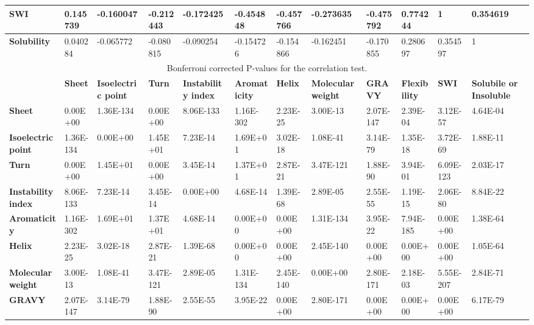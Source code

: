 \begin{table}[h]
{{\begin{tabular}{|l|l|l|l|l|l|l|l|l|l|l|l|}
\textbf{SWI}               & 0.145739  & -0.160047 & -0.212443 & -0.172425 & -0.454848 & -0.457766 & -0.273635 & -0.475792 & 0.774244  & 1         & 0.354619  \\ \hline
\textbf{Solubility}        & 0.040284  & -0.065772 & -0.080815 & -0.090254 & -0.154726 & -0.154866 & -0.162451 & -0.170855 & 0.280697  & 0.354597  & 1         \\ \hline
\multicolumn{12}{|c|}{Bonferroni corrected P-values for the correlation test.}                                                                                 \\ \hline
\textbf{} &
  \textbf{Sheet} &
  \textbf{Isoelectric point} &
  \textbf{Turn} &
  \textbf{Instability index} &
  \textbf{Aromaticity} &
  \textbf{Helix} &
  \textbf{Molecular weight} &
  \textbf{GRAVY} &
  \textbf{Flexibility} &
  \textbf{SWI} &
  \textbf{Solubile or Insoluble} \\ \hline
\textbf{Sheet}             & 0.00E+00  & 1.36E-134 & 0.00E+00  & 8.06E-133 & 1.16E-302 & 2.23E-25  & 3.00E-13  & 2.07E-147 & 2.39E-04  & 3.12E-57  & 4.64E-04  \\ \hline
\textbf{Isoelectric point} & 1.36E-134 & 0.00E+00  & 1.45E+01  & 7.23E-14  & 1.69E+01  & 3.02E-18  & 1.08E-41  & 3.14E-79  & 1.35E-18  & 3.72E-69  & 1.88E-11  \\ \hline
\textbf{Turn}              & 0.00E+00  & 1.45E+01  & 0.00E+00  & 3.45E-14  & 1.37E+01  & 2.87E-21  & 3.47E-121 & 1.88E-90  & 3.94E-01  & 6.09E-123 & 2.03E-17  \\ \hline
\textbf{Instability index} & 8.06E-133 & 7.23E-14  & 3.45E-14  & 0.00E+00  & 4.68E-14  & 1.39E-68  & 2.89E-05  & 2.55E-55  & 1.19E-15  & 2.06E-80  & 8.84E-22  \\ \hline
\textbf{Aromaticity}       & 1.16E-302 & 1.69E+01  & 1.37E+01  & 4.68E-14  & 0.00E+00  & 0.00E+00  & 1.31E-134 & 3.95E-22  & 7.94E-185 & 0.00E+00  & 1.38E-64  \\ \hline
\textbf{Helix}             & 2.23E-25  & 3.02E-18  & 2.87E-21  & 1.39E-68  & 0.00E+00  & 0.00E+00  & 2.45E-140 & 0.00E+00  & 0.00E+00  & 0.00E+00  & 1.05E-64  \\ \hline
\textbf{Molecular weight}  & 3.00E-13  & 1.08E-41  & 3.47E-121 & 2.89E-05  & 1.31E-134 & 2.45E-140 & 0.00E+00  & 2.80E-171 & 2.18E-03  & 5.55E-207 & 2.84E-71  \\ \hline
\textbf{GRAVY}             & 2.07E-147 & 3.14E-79  & 1.88E-90  & 2.55E-55  & 3.95E-22  & 0.00E+00  & 2.80E-171 & 0.00E+00  & 0.00E+00  & 0.00E+00  & 6.17E-79  \\ \hline

\end{tabular}}}
\end{table}
